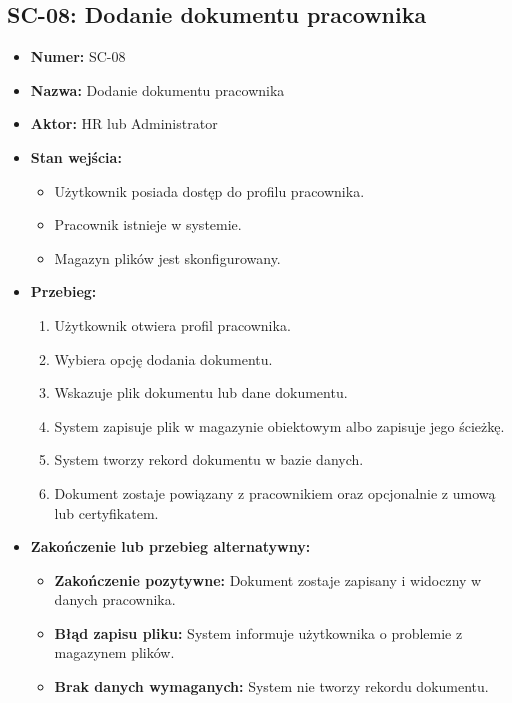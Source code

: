 \subsection{SC-08: Dodanie dokumentu pracownika}
\begin{itemize}
    \item \textbf{Numer:} SC-08
    \item \textbf{Nazwa:} Dodanie dokumentu pracownika
    \item \textbf{Aktor:} HR lub Administrator
    \item \textbf{Stan wejścia:}
    \begin{itemize}
        \item Użytkownik posiada dostęp do profilu pracownika.
        \item Pracownik istnieje w systemie.
        \item Magazyn plików jest skonfigurowany.
    \end{itemize}
    \item \textbf{Przebieg:}
    \begin{enumerate}
        \item Użytkownik otwiera profil pracownika.
        \item Wybiera opcję dodania dokumentu.
        \item Wskazuje plik dokumentu lub dane dokumentu.
        \item System zapisuje plik w magazynie obiektowym albo zapisuje jego ścieżkę.
        \item System tworzy rekord dokumentu w bazie danych.
        \item Dokument zostaje powiązany z pracownikiem oraz opcjonalnie z umową lub certyfikatem.
    \end{enumerate}
    \item \textbf{Zakończenie lub przebieg alternatywny:}
    \begin{itemize}
        \item \textbf{Zakończenie pozytywne:} Dokument zostaje zapisany i widoczny w danych pracownika.
        \item \textbf{Błąd zapisu pliku:} System informuje użytkownika o problemie z magazynem plików.
        \item \textbf{Brak danych wymaganych:} System nie tworzy rekordu dokumentu.
    \end{itemize}
\end{itemize}

